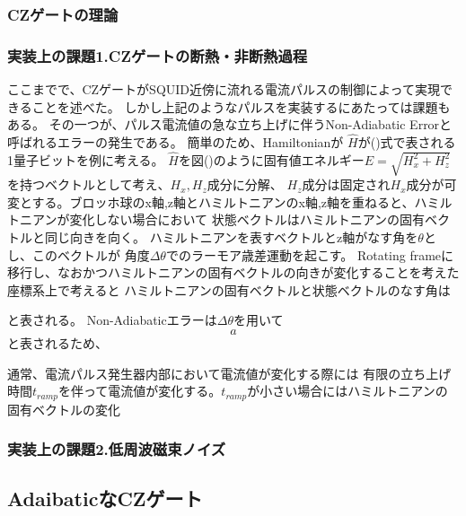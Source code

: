         \subsubsection{CZゲートの理論}
        \subsubsection{実装上の課題1.CZゲートの断熱・非断熱過程}
        ここまでで、CZゲートがSQUID近傍に流れる電流パルスの制御によって実現できることを述べた。
        しかし上記のようなパルスを実装するにあたっては課題もある。
        その一つが、パルス電流値の急な立ち上げに伴うNon-Adiabatic Errorと呼ばれるエラーの発生である。
        簡単のため、Hamiltonianが $\hat{H}$が()式で表される1量子ビットを例に考える。
        $\hat{H}$を図()のように固有値エネルギー$E=\sqrt{H_x^2+H_z^2}$を持つベクトルとして考え、$H_x,H_z$成分に分解、
        $H_z$成分は固定され$H_x$成分が可変とする。ブロッホ球のx軸,z軸とハミルトニアンのx軸,z軸を重ねると、ハミルトニアンが変化しない場合において
        状態ベクトルはハミルトニアンの固有ベクトルと同じ向きを向く。
        ハミルトニアンを表すベクトルとz軸がなす角を$\theta$とし、このベクトルが
        角度$\Delta \theta$でのラーモア歳差運動を起こす。
        Rotating frameに移行し、なおかつハミルトニアンの固有ベクトルの向きが変化することを考えた座標系上で考えると
        ハミルトニアンの固有ベクトルと状態ベクトルのなす角は
        
        と表される。
        Non-Adiabaticエラーは$\Delta \theta$を用いて
        \begin{equation}
            a
        \end{equation}
        と表されるため、
        
        通常、電流パルス発生器内部において電流値が変化する際には
        有限の立ち上げ時間$t_{ramp}$を伴って電流値が変化する。$t_{ramp}$が小さい場合にはハミルトニアンの固有ベクトルの変化
        \subsubsection{実装上の課題2.低周波磁束ノイズ}

    \subsection{AdaibaticなCZゲート}



        
        